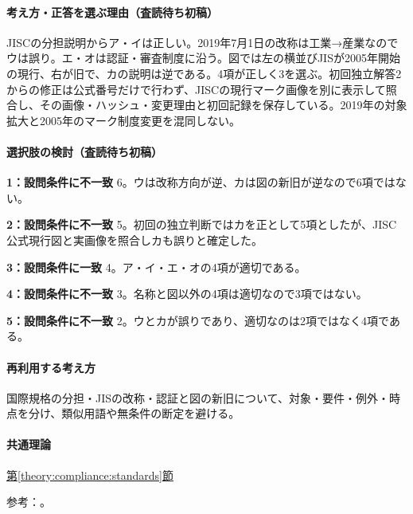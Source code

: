 \paragraph{考え方・正答を選ぶ理由（査読待ち初稿）} JISCの分担説明からア・イは正しい。2019年7月1日の改称は工業→産業なのでウは誤り。エ・オは認証・審査制度に沿う。図では左の横並びJISが2005年開始の現行、右が旧で、カの説明は逆である。4項が正しく3を選ぶ。初回独立解答2からの修正は公式番号だけで行わず、JISCの現行マーク画像を別に表示して照合し、その画像・ハッシュ・変更理由と初回記録を保存している。2019年の対象拡大と2005年のマーク制度変更を混同しない。

\paragraph{選択肢の検討（査読待ち初稿）}\mbox{}\par

\noindent\textbf{1：設問条件に不一致} 6。ウは改称方向が逆、カは図の新旧が逆なので6項ではない。\par

\noindent\textbf{2：設問条件に不一致} 5。初回の独立判断ではカを正として5項としたが、JISC公式現行図と実画像を照合しカも誤りと確定した。\par

\noindent\textbf{3：設問条件に一致} 4。ア・イ・エ・オの4項が適切である。\par

\noindent\textbf{4：設問条件に不一致} 3。名称と図以外の4項は適切なので3項ではない。\par

\noindent\textbf{5：設問条件に不一致} 2。ウとカが誤りであり、適切なのは2項ではなく4項である。\par

\paragraph{再利用する考え方} 国際規格の分担・JISの改称・認証と図の新旧について、対象・要件・例外・時点を分け、類似用語や無条件の断定を避ける。

\paragraph{共通理論} \hyperref[theory:compliance:standards]{第\ref*{theory:compliance:standards}節}

\par 参考：\cite{jisc_isoiec,jisc_certification,jisc_marks,meti_jis2019,mhlw_jis_history}。

